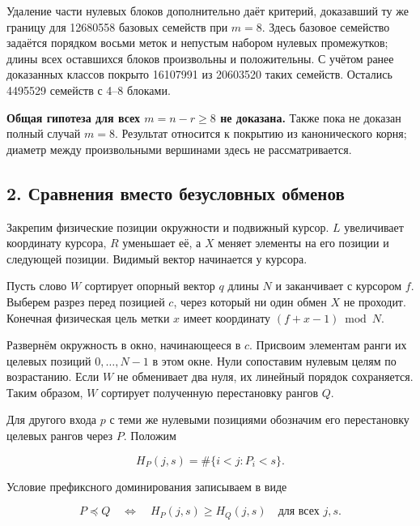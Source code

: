 \documentclass[
  11pt,
  a4paper,
]{article}
\begin{document}
Удаление части нулевых блоков дополнительно даёт критерий, доказавший ту
же границу для 12680558 базовых семейств при \(m=8\). Здесь базовое
семейство задаётся порядком восьми меток и непустым набором нулевых
промежутков; длины всех оставшихся блоков произвольны и положительны. С
учётом ранее доказанных классов покрыто 16107991 из 20603520 таких
семейств. Остались 4495529 семейств с 4--8 блоками.

\textbf{Общая гипотеза для всех \(m=n-r\ge8\) не доказана.} Также пока
не доказан полный случай \(m=8\). Результат относится к покрытию из
канонического корня; диаметр между произвольными вершинами здесь не
рассматривается.

\hypertarget{ux441ux440ux430ux432ux43dux435ux43dux438ux44f-ux432ux43cux435ux441ux442ux43e-ux431ux435ux437ux443ux441ux43bux43eux432ux43dux44bux445-ux43eux431ux43cux435ux43dux43eux432}{%
\subsection{2. Сравнения вместо безусловных
обменов}\label{ux441ux440ux430ux432ux43dux435ux43dux438ux44f-ux432ux43cux435ux441ux442ux43e-ux431ux435ux437ux443ux441ux43bux43eux432ux43dux44bux445-ux43eux431ux43cux435ux43dux43eux432}}

Закрепим физические позиции окружности и подвижный курсор. \(L\)
увеличивает координату курсора, \(R\) уменьшает её, а \(X\) меняет
элементы на его позиции и следующей позиции. Видимый вектор начинается у
курсора.

Пусть слово \(W\) сортирует опорный вектор \(q\) длины \(N\) и
заканчивает с курсором \(f\). Выберем разрез перед позицией \(c\), через
который ни один обмен \(X\) не проходит. Конечная физическая цель метки
\(x\) имеет координату \((f+x-1)\bmod N\).

Развернём окружность в окно, начинающееся в \(c\). Присвоим элементам
ранги их целевых позиций \(0,\ldots,N-1\) в этом окне. Нули сопоставим
нулевым целям по возрастанию. Если \(W\) не обменивает два нуля, их
линейный порядок сохраняется. Таким образом, \(W\) сортирует полученную
перестановку рангов \(Q\).

Для другого входа \(p\) с теми же нулевыми позициями обозначим его
перестановку целевых рангов через \(P\). Положим

\[H_P(j,s)=\#\{i<j:P_i<s\}.\]

Условие префиксного доминирования записываем в виде

\[P\preceq Q
\quad\Longleftrightarrow\quad
H_P(j,s)\ge H_Q(j,s)\quad\text{для всех }j,s.\tag{2}\]
\end{document}
